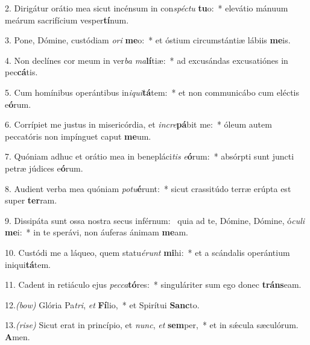 2. Dirigátur orátio mea sicut incénsum in con\textit{spéc}\textit{tu} \textbf{tu}o:~* elevátio mánuum meárum sacrifícium vesper\textbf{tí}num.

3. Pone, Dómine, custódiam \textit{o}\textit{ri} \textbf{me}o:~* et óstium circumstántiæ lábiis \textbf{me}is.

4. Non declínes cor meum in ver\textit{ba} \textit{ma}\textbf{lí}tiæ:~* ad excusándas excusatiónes in pec\textbf{cá}tis.

5. Cum homínibus operántibus in\textit{i}\textit{qui}\textbf{tá}tem:~* et non communicábo cum eléctis e\textbf{ó}rum.

6. Corrípiet me justus in misericórdia, et \textit{in}\textit{cre}\textbf{pá}bit me:~* óleum autem peccatóris non impínguet caput \textbf{me}um.

7. Quóniam adhuc et orátio mea in benepláci\textit{tis} \textit{e}\textbf{ó}rum:~* absórpti sunt juncti petræ júdices e\textbf{ó}rum.

8. Audient verba mea quóniam \textit{pot}\textit{u}\textbf{é}runt:~* sicut crassitúdo terræ erúpta est super \textbf{ter}ram.

9. Dissipáta sunt ossa nostra secus inférnum:~{\color{red}\GreDagger} quia ad te, Dómine, Dómine, ó\textit{cu}\textit{li} \textbf{me}i:~* in te sperávi, non áuferas ánimam \textbf{me}am.

10. Custódi me a láqueo, quem statu\textit{é}\textit{runt} \textbf{mi}hi:~* et a scándalis operántium iniqui\textbf{tá}tem.

11. Cadent in retiáculo ejus \textit{pec}\textit{ca}\textbf{tó}res:~* singuláriter sum ego donec \textbf{tráns}eam.

12.{\color{red}\textit{(bow)}} Glória Pa\textit{tri}, \textit{et} \textbf{Fí}lio,~* et Spirítui \textbf{Sanc}to.

13.{\color{red}\textit{(rise)}} Sicut erat in princípio, et \textit{nunc}, \textit{et} \textbf{sem}per,~* et in s\'{\ae}cula sæculórum. \textbf{A}men.
